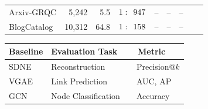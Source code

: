 \documentclass{article}
\begin{document}
\begin{table}[ht]
\begin{minipage}[t]{0.5\textwidth}
\begin{center}
\begin{adjustbox}{width=0.95\textwidth}
\begin{tabular} {l  r  r  r  r  r  r  r  r}
    Arxiv-GRQC
    		    & 5,242
                & 5.5
                & $1: \hspace{4.5pt} 947$
                & --
                & --
                & -- \\
	BlogCatalog
    		    & 10,312
                & 64.8
                & $1: \hspace{4.5pt} 158$
                & --
                & --
                & -- \\
	\hline
	\end{tabular}
\end{adjustbox}
\end{center}
\end{minipage}
\begin{minipage}[t]{0.5\textwidth}
\begin{center}
\begin{adjustbox}{width=\textwidth}
	\begin{tabular} {l  l  l}
	\hline
	\multicolumn{1}{l}{\multirow{1}{*}{\textbf{Baseline}}} &
	\multicolumn{1}{l}{\multirow{1}{*}{\textbf{Evaluation Task}}} &
	\multicolumn{1}{l}{\multirow{1}{*}{\textbf{~~Metric}}} \\ \hline \hline
    SDNE \cite{Wang:2016} ~
							& Reconstruction
							& ~~Precision@$k$ \\
    VGAE \cite{VGAE:2016} ~
				& Link Prediction
				 & ~~AUC, AP \\
    GCN \cite{Kipf:2016} ~
						& Node Classification
				 		& ~~Accuracy \\
	\hline
	\end{tabular}
\end{adjustbox}
\end{center}
\end{minipage}
\label{tab1}
\end{table}
\end{document}
